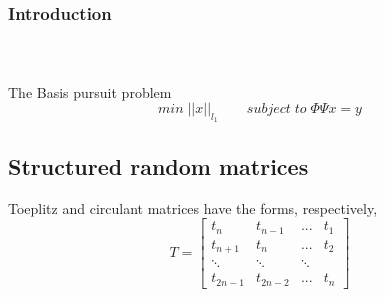 
\begin{frame}[t]
	\frametitle{Introduction}
	\framesubtitle{~~}  %

The Basis pursuit problem 
\begin{equation}
min  \;||x||_{l_1} \qquad   subject \; to \; \Phi \Psi x=y
\end{equation}

\subsection*{Structured random matrices}
Toeplitz and circulant matrices have the forms, respectively,
$$
T = \begin{bmatrix}
	t_n & t_{n-1} & ...& t_1           \\[0.3em]
	t_{n+1} & t_n & ... & t_2 \\[0.3em]
	\ddots &\ddots & \ddots    \\[0.3em]
	t_{2n-1}&t_{2n-2}& ... &t_n         
\end{bmatrix}
$$
\end{frame}




        
